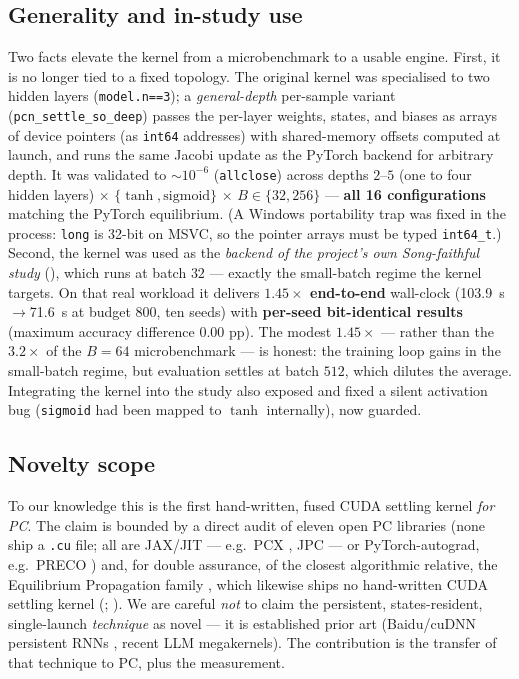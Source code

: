 \subsection{Generality and in-study use}

Two facts elevate the kernel from a microbenchmark to a usable engine. First, it is no longer tied
to a fixed topology. The original kernel was specialised to two hidden layers (\texttt{model.n==3});
a \emph{general-depth} per-sample variant (\texttt{pcn\_settle\_so\_deep}) passes the per-layer
weights, states, and biases as arrays of device pointers (as \texttt{int64} addresses) with
shared-memory offsets computed at launch, and runs the same Jacobi update as the PyTorch backend
for arbitrary depth. It was validated to \(\sim\!10^{-6}\) (\texttt{allclose}) across depths
\(2\)--\(5\) (one to four hidden layers) \(\times\) \(\{\tanh,\text{sigmoid}\}\) \(\times\)
\(B\in\{32,256\}\) --- \textbf{all 16 configurations} matching the PyTorch equilibrium. (A Windows
portability trap was fixed in the process: \texttt{long} is 32-bit on MSVC, so the pointer arrays
must be typed \texttt{int64\_t}.) Second, the kernel was used as the \emph{backend of the project's
own Song-faithful study} (), which runs at batch \(32\) --- exactly the
small-batch regime the kernel targets. On that real workload it delivers \textbf{\(1.45\times\)
end-to-end} wall-clock (\SI{103.9}{\second}\(\rightarrow\)\SI{71.6}{\second} at budget 800, ten
seeds) with \textbf{per-seed bit-identical results} (maximum accuracy difference \(0.00\) pp). The
modest \(1.45\times\) --- rather than the \(3.2\times\) of the \(B=64\) microbenchmark --- is
honest: the training loop gains in the small-batch regime, but evaluation settles at batch \(512\),
which dilutes the average. Integrating the kernel into the study also exposed and fixed a silent
activation bug (\texttt{sigmoid} had been mapped to \(\tanh\) internally), now guarded.

\subsection{Novelty scope}

To our knowledge this is the first hand-written, fused CUDA settling kernel \emph{for PC}. The
claim is bounded by a direct audit of eleven open PC libraries (none ship a \texttt{.cu} file; all
are JAX/JIT --- e.g.\ PCX \citep{pinchetti2024pcx}, JPC \citep{millidge2024jpc} --- or
PyTorch-autograd, e.g.\ PRECO \citep{vanzwol2024preco}) and, for double assurance, of the closest
algorithmic relative, the Equilibrium Propagation family \citep{scellier2017ep, laborieux2021ep},
which likewise ships no hand-written CUDA settling kernel (; ).
We are careful \emph{not} to claim the persistent, states-resident, single-launch \emph{technique}
as novel --- it is established prior art (Baidu/cuDNN persistent RNNs
\citep{diamos2016persistent}, recent LLM megakernels). The contribution is the transfer of that
technique to PC, plus the measurement.

